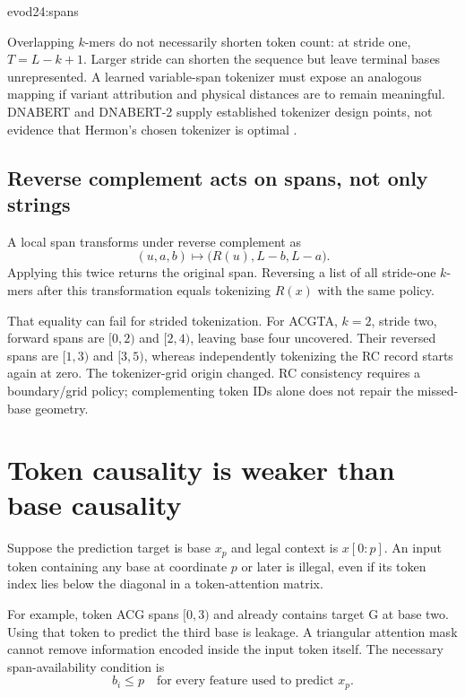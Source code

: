 {evod24:spans}

Overlapping $k$-mers do not necessarily shorten token count: at stride one,
$T=L-k+1$. Larger stride can shorten the sequence but leave terminal bases
unrepresented. A learned variable-span tokenizer must expose an analogous mapping
if variant attribution and physical distances are to remain meaningful.
DNABERT and DNABERT-2 supply established tokenizer design points, not evidence
that Hermon's chosen tokenizer is optimal \cite{evod24:dnabert,evod24:dnabert2}.

\subsection{Reverse complement acts on spans, not only strings}
A local span transforms under reverse complement as
\begin{equation}
(u,a,b)\longmapsto
\bigl(R(u),L-b,L-a\bigr).
\label{evod24:spanrc}
\end{equation}
Applying this twice returns the original span. Reversing a list of all stride-one
$k$-mers after this transformation equals tokenizing $R(x)$ with the same policy.

That equality can fail for strided tokenization. For ACGTA, $k=2$, stride two,
forward spans are $[0,2)$ and $[2,4)$, leaving base four uncovered. Their reversed
spans are $[1,3)$ and $[3,5)$, whereas independently tokenizing the RC record
starts again at zero. The tokenizer-grid origin changed.
RC consistency requires a boundary/grid policy; complementing token IDs alone
does not repair the missed-base geometry.

\section{Token causality is weaker than base causality}
Suppose the prediction target is base $x_p$ and legal context is $x[0:p]$.
An input token containing any base at coordinate $p$ or later is illegal,
even if its token index lies below the diagonal in a token-attention matrix.

For example, token ACG spans $[0,3)$ and already contains target G at base two.
Using that token to predict the third base is leakage. A triangular attention
mask cannot remove information encoded inside the input token itself.
The necessary span-availability condition is
\begin{equation}
b_i\le p
\quad\text{for every feature used to predict }x_p.
\label{evod24:availability}
\end{equation}

